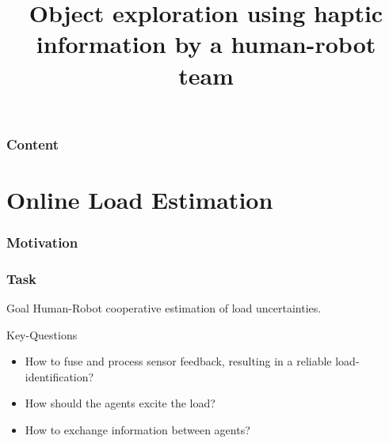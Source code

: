 \documentclass[student,noshadow]{ITRslides}
\title{Object exploration using haptic information by a human-robot team}
\begin{document}
\begin{frame}
	\titlepage
\end{frame}

\begin{frame}
	\frametitle{Content}
	\tableofcontents
\end{frame}

\section{Online Load Estimation}
\begin{frame}
	\frametitle{Motivation}
\end{frame}

\begin{frame}
	\frametitle{Task}
	\begin{block}{Goal}
		Human-Robot cooperative estimation of load uncertainties.
	\end{block}
	\vspace{2mm}
	\begin{block}{Key-Questions}
		\begin{itemize}
			\item How to fuse and process sensor feedback, resulting in a reliable load-identification?
			\item How should the agents excite the load?
			\item How to exchange information between agents?
		\end{itemize}	   
	\end{block}	
\end{frame}
\end{document}
